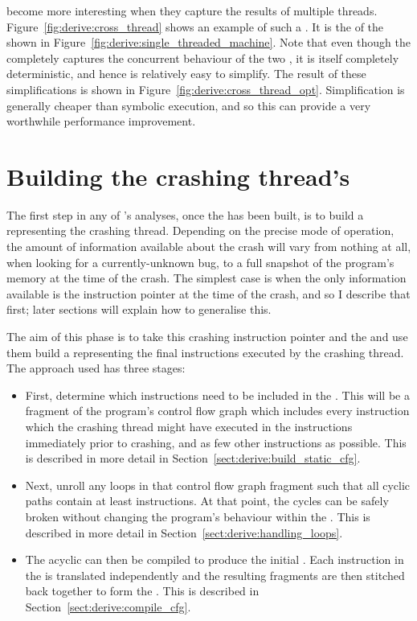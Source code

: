 {\STateMachines} become more interesting when they capture the results
of multiple threads.  Figure~\ref{fig:derive:cross_thread} shows an
example of such a {\StateMachine}.  It is the
 of the {\StateMachines} shown in
Figure~\ref{fig:derive:single_threaded_machine}.  Note that even
though the {\StateMachine} completely captures the concurrent
behaviour of the two {\StateMachines}, it is itself completely
deterministic, and hence is relatively easy to simplify.  The result
of these simplifications is shown in
Figure~\ref{fig:derive:cross_thread_opt}.  Simplification is generally
cheaper than symbolic execution, and so this can provide a very
worthwhile performance improvement.

\section{Building the crashing thread's \StateMachine}

The first step in any of {\technique}'s analyses, once the
 has been built, is to build a {\StateMachine}
representing the crashing thread.  Depending on the precise mode of
operation, the amount of information available about the crash will
vary from nothing at all, when looking for a currently-unknown bug, to
a full snapshot of the program's memory at the time of the crash.  The
simplest case is when the only information available is the
instruction pointer at the time of the crash, and so I describe that
first; later sections will explain how to generalise this.

The aim of this phase is to take this crashing instruction pointer and
the  and use them build a {\StateMachine}
representing the final \backref{$\alpha$} instructions executed by the
crashing thread.  The approach used has three stages:

\begin{itemize}
\item First, determine which instructions need to be included in the
  {\StateMachine}.  This will be a fragment of the program's control
  flow graph which includes every instruction which the crashing
  thread might have executed in the \backref{$\alpha$} instructions
  immediately prior to crashing, and as few other instructions as
  possible.  This is described in more detail in
  Section~\ref{sect:derive:build_static_cfg}.
\item Next, unroll any loops in that control flow graph fragment such
  that all cyclic paths contain at least \backref{$\alpha$}
  instructions.  At that point, the cycles can be safely broken
  without changing the program's behaviour within the
  .  This is described in more detail in
  Section~\ref{sect:derive:handling_loops}.
\item The acyclic  can then be compiled to produce the
  initial {\StateMachine}.  Each instruction in the  is
  translated independently and the resulting fragments are then
  stitched back together to form the {\StateMachine}.  This is
  described in Section~\ref{sect:derive:compile_cfg}.
\end{itemize}

